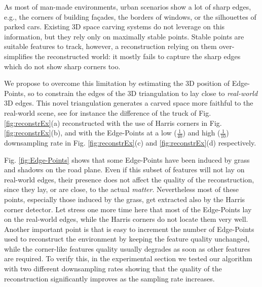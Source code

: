 As most of man-made environments, urban scenarios show a lot of sharp edges, e.g., the corners of building fa\c{c}ades, the borders of windows, or the silhouettes of parked cars. Existing 3D space carving systems do not leverage on this information, but they rely only on maximally stable points.
Stable points are suitable features to track, however, a reconstruction relying on them over-simplifies the reconstructed world: it mostly fails to capture the sharp edges which do not show sharp corners too.

We propose to overcome this limitation by estimating the 3D position of Edge-Points, so to constrain the edges of the 3D triangulation to lay close to \emph{real-world} 3D edges. 
This novel triangulation generates a carved space more faithful to the real-world scene, see for instance the difference of the truck of Fig. \ref{fig:reconstrEx}(a) reconstructed with the use of Harris corners in Fig. \ref{fig:reconstrEx}(b), and with the Edge-Points at a low ($\frac{1}{40}$) and high ($\frac{1}{10}$) downsampling rate  in Fig. \ref{fig:reconstrEx}(c) and \ref{fig:reconstrEx}(d) respectively. 

Fig. \ref{fig:Edge-Points} shows that some Edge-Points have been induced by grass and shadows on the road plane. Even if this subset of features will not lay on real-world edges, their presence does not affect the quality of the reconstruction, since they lay, or are close, to the actual \emph{matter}.
Nevertheless most of these points, especially those induced by the grass, get extracted also by the Harris corner detector. 
Let stress one more time here that most of the Edge-Points lay on the real-world edges, while the Harris corners do not locate them very well.
Another important point is that is easy to increment the number of Edge-Points used to reconstruct the environment by keeping the feature quality unchanged, while the corner-like features quality usually degrades as soon as other features are required. 
To verify this, in the experimental section we tested our algorithm with two different downsampling rates showing that the quality of the reconstruction significantly improves as the sampling rate increases. 


